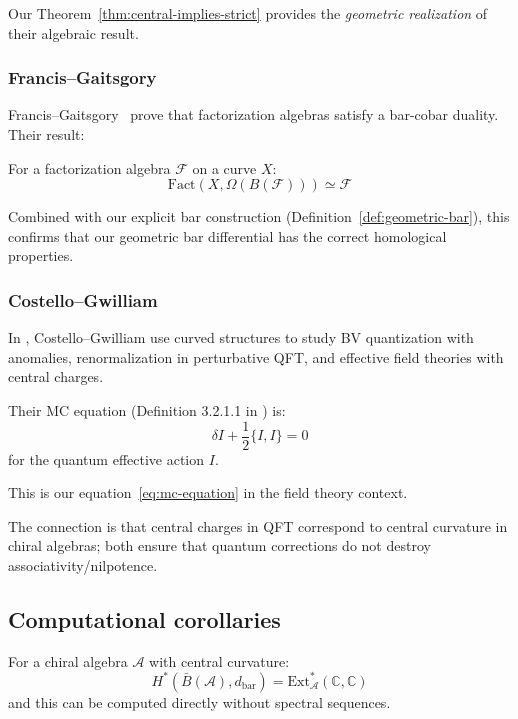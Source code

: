 Our Theorem~\ref{thm:central-implies-strict} provides the \emph{geometric realization} 
of their algebraic result.

\subsubsection{Francis--Gaitsgory}

Francis--Gaitsgory~\cite{FG12} prove that factorization algebras satisfy a 
bar-cobar duality. Their result:

\begin{theorem}
\label{thm:fg-factorization-bar-cobar}
For a factorization algebra $\mathcal{F}$ on a curve $X$:
\[\text{Fact}(X, \Omega(B(\mathcal{F}))) \simeq \mathcal{F}\]
\end{theorem}

Combined with our explicit bar construction (Definition~\ref{def:geometric-bar}), this confirms 
that our geometric bar differential has the correct homological properties.

\subsubsection{Costello--Gwilliam}

In \cite{CG-vol2}, Costello--Gwilliam use curved structures to study BV quantization with anomalies, renormalization in perturbative QFT, and effective field theories with central charges.

Their MC equation (Definition 3.2.1.1 in \cite{CG-vol2}) is:
\[\delta I + \frac{1}{2}\{I, I\} = 0\]
for the quantum effective action $I$.

This is our equation~\eqref{eq:mc-equation} in the field theory context.

The connection is that central charges in QFT correspond to central curvature in chiral algebras;
both ensure that quantum corrections do not destroy associativity/nilpotence.

\subsection{Computational corollaries}

\begin{corollary}\label{cor:bar-computes-ext}
For a chiral algebra $\mathcal{A}$ with central curvature:
\begin{equation}
H^*(\bar{B}(\mathcal{A}), d_{\text{bar}}) = \text{Ext}_{\mathcal{A}}^*(\mathbb{C}, \mathbb{C})
\end{equation}
and this can be computed directly without spectral sequences.
\end{corollary}

